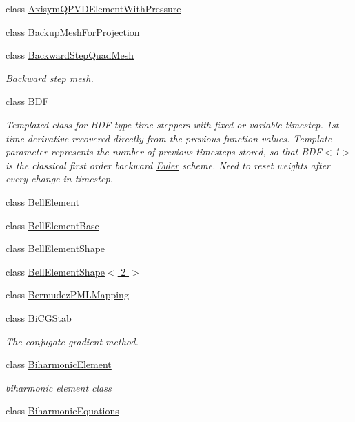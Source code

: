 \begin{DoxyCompactItemize}
\item 
class \hyperlink{classoomph_1_1AxisymQPVDElementWithPressure}{Axisym\+Q\+P\+V\+D\+Element\+With\+Pressure}
\item 
class \hyperlink{classoomph_1_1BackupMeshForProjection}{Backup\+Mesh\+For\+Projection}
\item 
class \hyperlink{classoomph_1_1BackwardStepQuadMesh}{Backward\+Step\+Quad\+Mesh}
\begin{DoxyCompactList}\small\item\em Backward step mesh. \end{DoxyCompactList}\item 
class \hyperlink{classoomph_1_1BDF}{B\+DF}
\begin{DoxyCompactList}\small\item\em Templated class for B\+D\+F-\/type time-\/steppers with fixed or variable timestep. 1st time derivative recovered directly from the previous function values. Template parameter represents the number of previous timesteps stored, so that B\+D\+F$<$1$>$ is the classical first order backward \hyperlink{classoomph_1_1Euler}{Euler} scheme. Need to reset weights after every change in timestep. \end{DoxyCompactList}\item 
class \hyperlink{classoomph_1_1BellElement}{Bell\+Element}
\item 
class \hyperlink{classoomph_1_1BellElementBase}{Bell\+Element\+Base}
\item 
class \hyperlink{classoomph_1_1BellElementShape}{Bell\+Element\+Shape}
\item 
class \hyperlink{classoomph_1_1BellElementShape_3_012_01_4}{Bell\+Element\+Shape$<$ 2 $>$}
\item 
class \hyperlink{classoomph_1_1BermudezPMLMapping}{Bermudez\+P\+M\+L\+Mapping}
\item 
class \hyperlink{classoomph_1_1BiCGStab}{Bi\+C\+G\+Stab}
\begin{DoxyCompactList}\small\item\em The conjugate gradient method. \end{DoxyCompactList}\item 
class \hyperlink{classoomph_1_1BiharmonicElement}{Biharmonic\+Element}
\begin{DoxyCompactList}\small\item\em biharmonic element class \end{DoxyCompactList}\item 
class \hyperlink{classoomph_1_1BiharmonicEquations}{Biharmonic\+Equations}

\end{DoxyCompactItemize}
